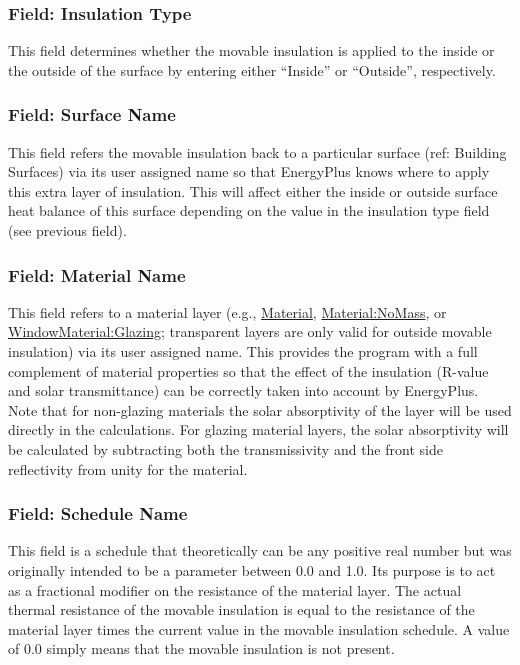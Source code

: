 \subsubsection{Field: Insulation Type}\label{field-insulation-type}

This field determines whether the movable insulation is applied to the inside or the outside of the surface by entering either ``Inside'' or ``Outside'', respectively.

\subsubsection{Field: Surface Name}\label{field-surface-name-1}

This field refers the movable insulation back to a particular surface (ref: Building Surfaces) via its user assigned name so that EnergyPlus knows where to apply this extra layer of insulation. This will affect either the inside or outside surface heat balance of this surface depending on the value in the insulation type field (see previous field).

\subsubsection{Field: Material Name}\label{field-material-name}

This field refers to a material layer (e.g., \hyperref[material]{Material}, \hyperref[materialnomass]{Material:NoMass}, or \hyperref[windowmaterialglazing]{WindowMaterial:Glazing}; transparent layers are only valid for outside movable insulation) via its user assigned name. This provides the program with a full complement of material properties so that the effect of the insulation (R-value and solar transmittance) can be correctly taken into account by EnergyPlus.  Note that for non-glazing materials the solar absorptivity of the layer will be used directly in the calculations.  For glazing material layers, the solar absorptivity will be calculated by subtracting both the transmissivity and the front side reflectivity from unity for the material.

\subsubsection{Field: Schedule Name}\label{field-schedule-name}

This field is a schedule that theoretically can be any positive real number but was originally intended to be a parameter between 0.0 and 1.0. Its purpose is to act as a fractional modifier on the resistance of the material layer. The actual thermal resistance of the movable insulation is equal to the resistance of the material layer times the current value in the movable insulation schedule. A value of 0.0 simply means that the movable insulation is not present.

